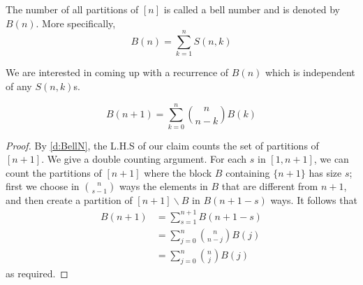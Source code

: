 \begin{definition}
The number of all partitions of $[n]$ is called a bell number and is denoted by $B(n)$. More specifically,
\[
B(n) = \sum_{k=1}^nS(n,k)
\]
\label{d:BellN}
\end{definition}
We are interested in coming up with a recurrence of $B(n)$ which is independent of any $S(n,k)$s. 
\begin{claim}
    \[
    B(n+1) = \sum_{k=0}^{n}\binom{n}{n-k}B(k)
    \]
\end{claim}
\begin{proof}
By \cref{d:BellN}, the L.H.S of our claim counts the set of partitions of $[n + 1]$. We give a double counting argument. For each $s$ in $[1,n+1]$, we can count the partitions of $[n+1]$ where the block $B$ containing $\{n + 1\}$ has size $s$; first we choose in $\binom{n}{s-1}$ ways the elements in $B$ that are different from $n+1$, and then create a partition of $[n + 1] \backslash B$ in $B(n + 1 - s)$ ways. It follows that 
\begin{align*}
    B(n+1) &= \sum_{s=1}^{n+1}B(n+1-s) \\
    &= \sum_{j=0}^n\binom{n}{n-j}B(j) \\
    &= \sum_{j=0}^n\binom{n}{j}B(j)
\end{align*}
as required. 
\end{proof}
